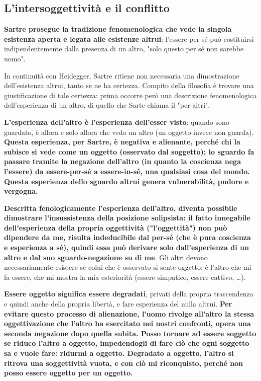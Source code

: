 \subsection{L'intersoggettività e il conflitto}

\textbf{Sartre prosegue la tradizione fenomenologica che vede la singola esistenza aperta e legata alle esistenze altrui}: l'essere-per-sé può costituirsi indipendentemente dalla presenza di un altro, "solo questo per sé non sarebbe uomo".

In continuità con Heidegger, Sartre ritiene non necessaria una dimostrazione dell'esistenza altrui, tanto se ne ha certezza.
Compito della filosofia è trovare una giustificazione di tale certezza: prima occorre però una descrizione fenomenologica dell'esperienza di un altro, di quello che Sarte chiama il "per-altri".

\textbf{L'esperienza dell'altro è l'esperienza dell'esser visto}: quando sono guardato, è allora e solo allora che vedo un altro (un oggetto invece non guarda). \textbf{Questa esperienza, per Sartre, è negativa e alienante, perché chi la subisce si vede come un oggetto (osservato dal soggetto); lo sguardo fa passare tramite la negazione dell'altro (in quanto la coscienza nega l'essere) da essere-per-sé a essere-in-sé, una qualsiasi cosa del mondo. Questa esperienza dello sguardo altrui genera vulnerabilità, pudore e vergogna.}

\textbf{Descritta fenologicamente l'esperienza dell'altro, diventa possibile dimostrare l'insussistenza della posizione solipsista: il fatto innegabile dell'esperienza della propria oggettività ("l'oggettità") non può dipendere da me, risulta indeducibile dal per-sé (che è pura coscienza e esperienza a sé), quindi essa può derivare solo dall'esperienza di un altro e dal suo sguardo-negazione su di me}. Gli altri devono necessariamente esistere se colui che è osservato si sente oggetto: è l'altro che mi fa essere, che mi mostra la mia esteriorità (essere simpatico, essere cattivo, \dots).

\textbf{Essere oggetto significa essere degradati}, privati della propria trascendenza e quindi anche della propria libertà, e fare esperienza del nulla altrui. \textbf{Per evitare questo processo di alienazione, l'uomo  rivolge all'altro la stessa oggettivazione che l'altro ha esercitato nei nostri confronti, opera una seconda negazione dopo quella subita. Posso tornare ad essere soggetto se riduco l'altro a oggetto, impedendogli di fare ciò che ogni soggetto sa e vuole fare: ridurmi a oggetto. Degradato a oggetto, l'altro si ritrova una soggettività vuota, e con ciò mi riconquisto, perché non posso essere oggetto per un oggetto.}

